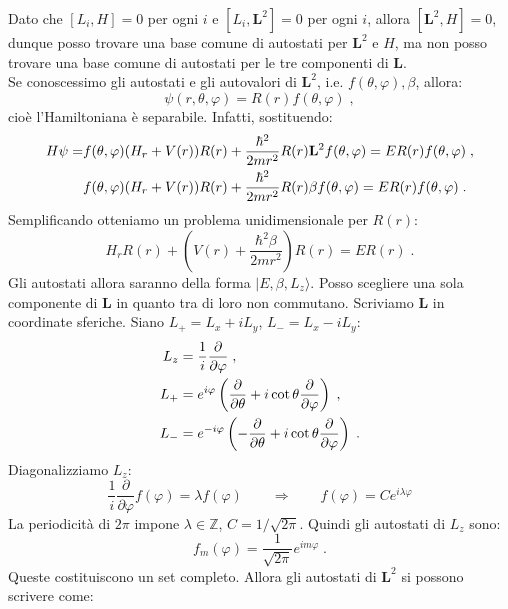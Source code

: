 \documentclass[10pt,a4paper]{report}
\theoremstyle{definition}
\numberwithin{equation}{section}
\newcommand{\ket}{\rangle}
\begin{document}
Dato che $[L_i,H]=0$ per ogni $i$ e $[L_i,\mathbf{L}^2]=0$ per ogni $i$, allora $[\mathbf{L}^2,H]=0$, dunque posso trovare  una base comune di autostati per $\mathbf{L}^2$ e $H$, ma non posso trovare una base comune di autostati per le tre componenti di $\mathbf{L}$. \\
Se conoscessimo gli autostati e gli autovalori di $\mathbf{L}^2$, i.e. $f(\theta,\varphi),\beta$, allora:
\begin{equation}
\psi(r,\theta,\varphi)=R(r)f(\theta,\varphi)\;,
\end{equation}
cioè l'Hamiltoniana è separabile. Infatti, sostituendo:
\begin{align}
H\psi= &f(\theta,\varphi)(H_r+V(r))R(r)+\frac{\hbar^2}{2mr^2}R(r)\mathbf{L}^2f(\theta,\varphi)=ER(r)f(\theta,\varphi)\;, \notag \\
&f(\theta,\varphi)(H_r+V(r))R(r)+\frac{\hbar^2}{2mr^2}R(r)\beta f(\theta,\varphi)=ER(r)f(\theta,\varphi)\;.
\end{align}
Semplificando otteniamo un problema unidimensionale per $R(r)$:
\begin{equation}
H_rR(r)+\left(V(r)+\frac{\hbar^2\beta}{2mr^2}\right)R(r)=ER(r)\;.
\end{equation}
Gli autostati allora saranno della forma $|E,\beta,L_z\ket$. Posso scegliere una sola componente di $\mathbf{L}$ in quanto tra di loro non commutano. Scriviamo $\mathbf{L}$ in coordinate sferiche. Siano $L_+=L_x+iL_y$, $L_-=L_x-iL_y$:
\begin{align}
L_z &= \frac{1}{i}\frac{\partial}{\partial\varphi}\;, \notag \\
L_+ &= e^{i\varphi}\left(\frac{\partial}{\partial\theta}+i\cot\theta\frac{\partial}{\partial\varphi}\right)\;, \notag \\
L_- &= e^{-i\varphi}\left(-\frac{\partial}{\partial\theta}+i\cot\theta\frac{\partial}{\partial\varphi}\right)\;. \label{ch7_lrappschro}
\end{align}
Diagonalizziamo $L_z$:
\begin{equation}
\frac{1}{i}\frac{\partial}{\partial\varphi}f(\varphi)=\lambda f(\varphi)\qquad \Longrightarrow \qquad f(\varphi)=C e^{i\lambda\varphi}
\end{equation}
La periodicità di $2\pi$ impone $\lambda\in\mathbb{Z}$, $C=1/\sqrt{2\pi}$. Quindi gli autostati di $L_z$ sono:
\begin{equation}
f_m(\varphi)=\frac{1}{\sqrt{2\pi}}e^{im\varphi}\;.
\end{equation}
Queste costituiscono un set completo. Allora gli autostati di $\mathbf{L}^2$ si possono scrivere come:
\end{document}
